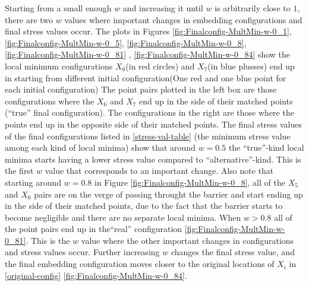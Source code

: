 \documentclass[11pt]{article} %
\begin{document}
		Starting from a small enough $w$ and increasing it until $w$ is arbitrarily close to $1$, there are two $w$ values where important changes in embedding configurations and final stress values occur.
    The plots in Figures \ref{fig:Finalconfig-MultMin-w-0_1}, \ref{fig:Finalconfig-MultMin-w-0_5}, \ref{fig:Finalconfig-MultMin-w-0_8}, \ref{fig:Finalconfig-MultMin-w-0_81} , \ref{fig:Finalconfig-MultMin-w-0_84} show the local minimum configurations ${X}_6$(in red circles) and ${X}_7$(in blue plusses) end up in starting from different initial configuration(One red and one blue point for each  initial configuration) The point pairs plotted in the left box are those configurations  where the  ${X}_6$ and ${X}_7$ end up in the side of their matched points (``true'' final configuration). The configurations in the right are those where the points end up in the opposite side of their matched points. The final stress values of the final configurations listed in  \ref{stress-val-table} (the minimum stress value among each kind of local minima) show that around $w=0.5$ the  ``true''-kind local minima   starts having a lower stress value compared to ``alternative''-kind. This is the first $w$ value that corresponds to an important change. Also note that starting around $w=0.8$ in Figure \ref{fig:Finalconfig-MultMin-w-0_8}, all of the $X_5$ and $X_6$  pairs are on the verge of passing throught the barrier and start ending up in the side of their matched points, due to the fact that the barrier starts to become negligible and there are no separate local minima. When $w>0.8$ all of the point pairs end up in  the``real'' configuration \ref{fig:Finalconfig-MultMin-w-0_81}. This is the $w$ value where the other important changes in configurations and stress values occur. Further increasing $w$ changes the final stress value, and  the final embedding configuration moves closer to the original locations of $X_{i}$ in \ref{original-config} \ref{fig:Finalconfig-MultMin-w-0_84}.
    
\end{document}
